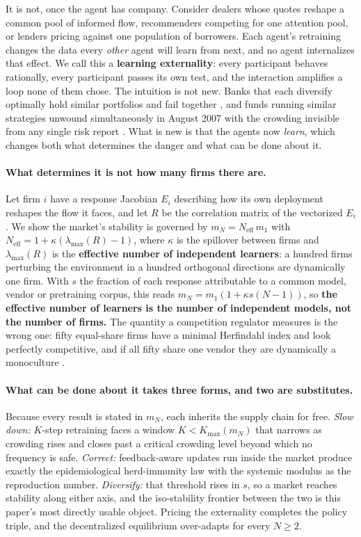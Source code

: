 \documentclass{article}
\theoremstyle{plain}
\theoremstyle{definition}
\newcommand{\Neff}{N_{\mathrm{eff}}}
\newcommand{\mN}{m_N}
\newcommand{\lmax}{\lambda_{\max}}
\begin{document}
It is not, once the agent has company. Consider dealers whose quotes reshape a common pool of informed flow, recommenders competing for one attention pool, or lenders pricing against one population of borrowers. Each agent's retraining changes the data every \emph{other} agent will learn from next, and no agent internalizes that effect. We call this a \textbf{learning externality}: every participant behaves rationally, every participant passes its own test, and the interaction amplifies a loop none of them chose. The intuition is not new. Banks that each diversify optimally hold similar portfolios and fail together \citep{beale2011,wagner2010}, and funds running similar strategies unwound simultaneously in August 2007 with the crowding invisible from any single risk report \citep{khandani2007}. What is new is that the agents now \emph{learn}, which changes both what determines the danger and what can be done about it.

\paragraph{What determines it is not how many firms there are.}
Let firm $i$ have a response Jacobian $E_i$ describing how its own deployment reshapes the flow it faces, and let $R$ be the correlation matrix of the vectorized $E_i$. We show the market's stability is governed by $\mN = \Neff\, m_1$ with $\Neff = 1 + \kappa(\lmax(R)-1)$, where $\kappa$ is the spillover between firms and $\lmax(R)$ is the \textbf{effective number of independent learners}: a hundred firms perturbing the environment in a hundred orthogonal directions are dynamically one firm. With $s$ the fraction of each response attributable to a common model, vendor or pretraining corpus, this reads $\mN = m_1(1 + \kappa s (N-1))$, so \textbf{the effective number of learners is the number of independent models, not the number of firms.} The quantity a competition regulator measures is the wrong one: fifty equal-share firms have a minimal Herfindahl index and look perfectly competitive, and if all fifty share one vendor they are dynamically a monoculture \citep{hirschman1964}.

\paragraph{What can be done about it takes three forms, and two are substitutes.}
Because every result is stated in $\mN$, each inherits the supply chain for free. \emph{Slow down:} $K$-step retraining faces a window $K < K_{\max}(\mN)$ that narrows as crowding rises and closes past a critical crowding level beyond which no frequency is safe. \emph{Correct:} feedback-aware updates \citep{izzo2021} run inside the market produce exactly the epidemiological herd-immunity law with the systemic modulus as the reproduction number. \emph{Diversify:} that threshold rises in $s$, so a market reaches stability along either axis, and the iso-stability frontier between the two is this paper's most directly usable object. Pricing the externality completes the policy triple, and the decentralized equilibrium over-adapts for every $N \geq 2$.
\end{document}

